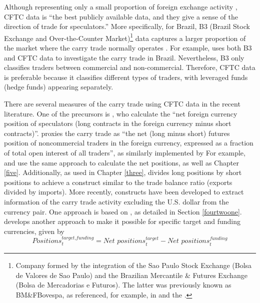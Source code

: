 \documentclass[a4paper, twoside]{templates/ociamthesis}
\begin{document}
Although representing only a small proportion of foreign exchange activity \autocite{galati2007,bankforinternationalsettlements2015}, CFTC data is ``the best publicly available data, and they give a sense of the direction of trade for speculators.'' \autocite[ 321]{brunnermeier2008} More specifically, for Brazil, B3 (Brazil Stock Exchange and Over-the-Counter Market)\footnote{Company formed by the integration of the Sao Paulo Stock Exchange (Bolsa de Valores de Sao Paulo) and the Brazilian Mercantile \& Futures Exchange (Bolsa de Mercadorias e Futuros). The latter was previously known as BM\&FBovespa, as referenced, for example, in \textcite{rossi2012} and the \textcite{bankforinternationalsettlements2015}.} data captures a larger proportion of the market where the carry trade normally operates \autocite{bankforinternationalsettlements2015}. For example, \textcite{rossi2012} uses both B3 and CFTC data to investigate the carry trade in Brazil. Nevertheless, B3 only classifies traders between commercial and non-commercial. Therefore, CFTC data is preferable because it classifies different types of traders, with leveraged funds (hedge funds) appearing separately.

There are several measures of the carry trade using CFTC data in the recent literature. One of the precursors is \textcite[ 21]{klitgaard2004}, who calculate the ``net foreign currency position of speculators (long contracts in the foreign currency minus short contracts)''. \textcite[ 321]{brunnermeier2008} proxies the carry trade as ``the net (long minus short) futures position of noncommercial traders in the foreign currency, expressed as a fraction of total open interest of all traders'', as similarly implemented by \textcite[ 26]{klitgaard2004} For example, \textcite{anzuini2012} and \textcite{hutchison2013} use the same approach to calculate the net positions, as well as Chapter \ref{five}. Additionally, as used in Chapter \ref{three}, \textcite{nishigaki2007} divides long positions by short positions to achieve a construct similar to the trade balance ratio (exports divided by imports). More recently, constructs have been developed to extract information of the carry trade activity excluding the U.S. dollar from the currency pair. One approach is based on \textcite{fong2013}, as detailed in Section \ref{fourtwoone}. \textcite{hasselgren2020} develops another approach to make it possible for specific target and funding currencies, given by
\begin{equation}
\textit{Positions}_{t}^\textit{target,funding} = \textit{Net positions}_{t}^\textit{target} - \textit{Net positions}_{t}^\textit{funding}
\label{eq:16}
\end{equation}
\end{document}
